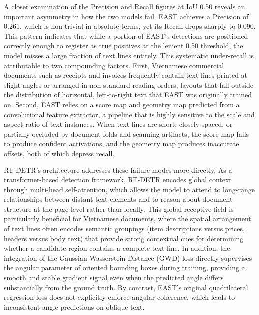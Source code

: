 A closer examination of the Precision and Recall figures at IoU 0.50 reveals an important asymmetry in how the two models fail. EAST achieves a Precision of 0.261, which is non-trivial in absolute terms, yet its Recall drops sharply to 0.090. This pattern indicates that while a portion of EAST's detections are positioned correctly enough to register as true positives at the lenient 0.50 threshold, the model misses a large fraction of text lines entirely. This systematic under-recall is attributable to two compounding factors. First, Vietnamese commercial documents such as receipts and invoices frequently contain text lines printed at slight angles or arranged in non-standard reading orders, layouts that fall outside the distribution of horizontal, left-to-right text that EAST was originally trained on. Second, EAST relies on a score map and geometry map predicted from a convolutional feature extractor, a pipeline that is highly sensitive to the scale and aspect ratio of text instances. When text lines are short, closely spaced, or partially occluded by document folds and scanning artifacts, the score map fails to produce confident activations, and the geometry map produces inaccurate offsets, both of which depress recall.

RT-DETR's architecture addresses these failure modes more directly. As a transformer-based detection framework, RT-DETR encodes global context through multi-head self-attention, which allows the model to attend to long-range relationships between distant text elements and to reason about document structure at the page level rather than locally. This global receptive field is particularly beneficial for Vietnamese documents, where the spatial arrangement of text lines often encodes semantic groupings (item descriptions versus prices, headers versus body text) that provide strong contextual cues for determining whether a candidate region contains a complete text line. In addition, the integration of the Gaussian Wasserstein Distance (GWD) loss directly supervises the angular parameter of oriented bounding boxes during training, providing a smooth and stable gradient signal even when the predicted angle differs substantially from the ground truth. By contrast, EAST's original quadrilateral regression loss does not explicitly enforce angular coherence, which leads to inconsistent angle predictions on oblique text.

